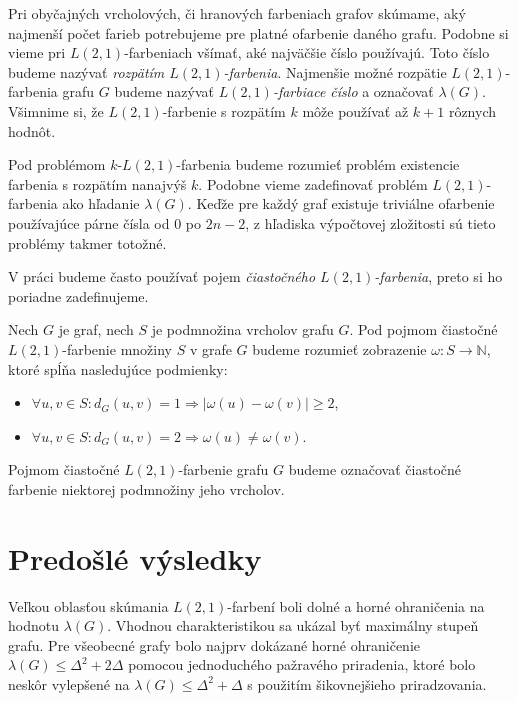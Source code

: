 Pri obyčajných vrcholových, či hranových farbeniach grafov skúmame, aký
najmenší počet farieb potrebujeme pre platné ofarbenie daného grafu. Podobne
si vieme pri $L(2,1)$-farbeniach všímať, aké najväčšie číslo používajú. Toto
číslo budeme nazývať \emph{rozpätím $L(2,1)$-farbenia}. Najmenšie možné rozpätie
$L(2,1)$-farbenia grafu $G$ budeme nazývať \emph{$L(2,1)$-farbiace číslo} a
označovať $\lambda(G)$. Všimnime si, že $L(2,1)$-farbenie s
rozpätím $k$ môže používať až $k+1$ rôznych hodnôt.

Pod problémom $k$-$L(2,1)$-farbenia budeme rozumieť problém existencie farbenia
s rozpätím nanajvýš $k$. Podobne vieme zadefinovať problém $L(2,1)$-farbenia ako
hľadanie $\lambda(G)$. Keďže pre každý graf existuje triviálne ofarbenie
používajúce párne čísla od $0$ po $2n - 2$, z hľadiska výpočtovej zložitosti
sú tieto problémy takmer totožné.

V práci budeme často používať pojem \emph{čiastočného $L(2,1)$-farbenia}, preto
si ho poriadne zadefinujeme.

\begin{defn}
    Nech $G$ je graf, nech $S$ je podmnožina vrcholov grafu $G$. Pod pojmom
    čiastočné $L(2,1)$-farbenie množiny $S$ v grafe $G$ budeme rozumieť zobrazenie
    $\omega : S \to \mathbb{N}$, ktoré spĺňa nasledujúce podmienky:

    \begin{itemize}
        \item $\forall u, v \in S: d_G(u,v) = 1 \Rightarrow \left| \omega(u) - \omega(v) \right| \ge 2$,
        \item $\forall u, v \in S: d_G(u,v) = 2 \Rightarrow \omega(u) \neq \omega(v)$.
    \end{itemize}

    Pojmom čiastočné $L(2,1)$-farbenie grafu $G$ budeme označovať čiastočné farbenie
    niektorej podmnožiny jeho vrcholov.
\end{defn}

\section{Predošlé výsledky}

Veľkou oblasťou skúmania $L(2,1)$-farbení boli dolné a horné ohraničenia na hodnotu $\lambda(G)$.
Vhodnou charakteristikou sa ukázal byť maximálny stupeň grafu. Pre všeobecné
grafy bolo najprv dokázané horné ohraničenie $\lambda(G) \leq \Delta^2 + 2\Delta$
pomocou jednoduchého pažravého priradenia\cite{griggs_yeh_tree},
ktoré bolo neskôr vylepšené na $\lambda(G) \leq \Delta^2 + \Delta$ s použitím
šikovnejšieho priradzovania\cite{chang_kuo}.

